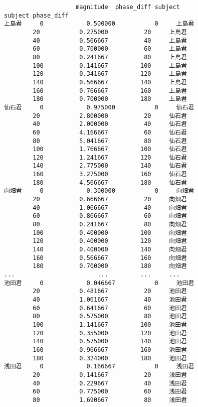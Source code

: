 \documentclass[11pt]{article}
\begin{document}
    
    \begin{verbatim}
                    magnitude  phase_diff subject
subject phase_diff                               
上島君     0            0.500000           0     上島君
        20           0.275000          20     上島君
        40           0.566667          40     上島君
        60           0.700000          60     上島君
        80           0.241667          80     上島君
        100          0.141667         100     上島君
        120          0.341667         120     上島君
        140          0.566667         140     上島君
        160          0.766667         160     上島君
        180          0.700000         180     上島君
仙石君     0            0.975000           0     仙石君
        20           2.800000          20     仙石君
        40           2.000000          40     仙石君
        60           4.166667          60     仙石君
        80           5.041667          80     仙石君
        100          1.766667         100     仙石君
        120          1.241667         120     仙石君
        140          2.775000         140     仙石君
        160          3.275000         160     仙石君
        180          4.566667         180     仙石君
向畑君     0            0.300000           0     向畑君
        20           0.666667          20     向畑君
        40           1.066667          40     向畑君
        60           0.866667          60     向畑君
        80           0.241667          80     向畑君
        100          0.400000         100     向畑君
        120          0.400000         120     向畑君
        140          0.400000         140     向畑君
        160          0.566667         160     向畑君
        180          0.700000         180     向畑君
...                       ...         ...     ...
池田君     0            0.046667           0     池田君
        20           0.481667          20     池田君
        40           1.061667          40     池田君
        60           0.641667          60     池田君
        80           0.575000          80     池田君
        100          1.141667         100     池田君
        120          0.355000         120     池田君
        140          0.575000         140     池田君
        160          0.966667         160     池田君
        180          0.324000         180     池田君
浅田君     0            0.166667           0     浅田君
        20           0.141667          20     浅田君
        40           0.229667          40     浅田君
        60           0.775000          60     浅田君
        80           1.690667          80     浅田君

\end{verbatim}
\end{document}
